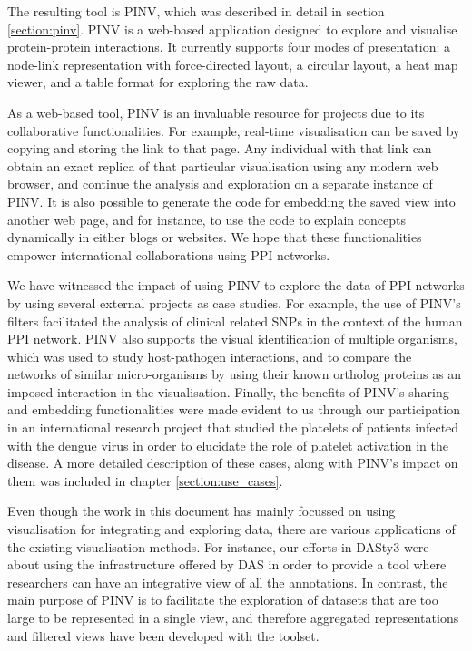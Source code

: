 The resulting tool is PINV, which was described in detail in section \ref{section:pinv}. PINV is a web-based application designed to explore and visualise protein-protein interactions. It currently supports four modes of presentation: a node-link representation with force-directed layout, a circular layout, a heat map viewer, and a table format for exploring the raw data. 

As a web-based tool, PINV is an invaluable resource for projects due to its collaborative functionalities. For example, real-time visualisation can be saved by copying and storing the link to that page. Any individual with that link can obtain an exact replica of that particular visualisation using any modern web browser, and continue the analysis and exploration on a separate instance of PINV. It is also possible to generate the code for embedding the saved view into another web page, and for instance, to use the code to explain concepts dynamically  in either blogs or websites. We hope that these functionalities empower international collaborations using PPI networks.

We have witnessed the impact of using PINV to explore the data of PPI networks by using several external projects as case studies. For example, the use of PINV's filters facilitated the analysis of clinical related SNPs in the context of the human PPI network. PINV also supports the visual identification of multiple organisms, which was used to study host-pathogen interactions, and to compare the networks of similar micro-organisms by using their known ortholog proteins as an imposed interaction in the visualisation. Finally, the benefits of PINV's sharing and embedding functionalities were made evident to us through our participation in an international research project that studied the platelets of patients infected with the dengue virus in order to elucidate the role of platelet activation in the disease.  A more detailed description of these cases, along with PINV's impact on them was included in chapter \ref{section:use_cases}.

Even though the work in this document has mainly focussed on using visualisation for integrating and exploring data, there are various applications of the existing visualisation methods. For instance, our efforts in DASty3 were about using the infrastructure offered by DAS in order to provide a tool where researchers can have an integrative view of all the annotations. In contrast, the main purpose of PINV is to facilitate the exploration of datasets that are too large to be represented in a single view, and therefore aggregated representations and filtered views have been developed with the toolset.

